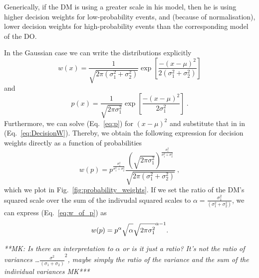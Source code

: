 \documentclass[a4paper, 12pt]{article}
\newcommand{\elabel}[1]{\label{eq:#1}}
\newcommand{\eref}[1]{(Eq.~\ref{eq:#1})}
\newcommand{\fref}[1]{Fig.~\ref{fig:#1}}
\newcommand{\be}{\begin{equation}}
\newcommand{\ee}{\end{equation}}
\newcommand{\ND}{\mathcal{N}} %
\newcommand{\MK}[1]{{\it ***MK: #1 MK***}}
\begin{document}
%
%

Generically, if the DM is using a greater scale in his model, then he is using higher decision weights for low-probability events, and (because of normalisation), lower decision weights for high-probability events than the corresponding model of the DO.


In the Gaussian case we can write the distributions explicitly
\be \elabel{DecisionW}
	w(x)=\frac{1}{\sqrt{2\pi (\sigma_1^2+\sigma_2^2)}}\exp\left[\frac{-(x -\mu )^2}{2 (\sigma_1^2+\sigma_2^2)}\right]
\ee
and
\be
	p(x)=\frac{1}{\sqrt{2\pi \sigma_1^2}}\exp\left[\frac{-(x -\mu )^2}{2 \sigma_1^2}\right] ~.
\elabel{p}
\ee
% 
Furthermore, we can solve \eref{p} for $(x -\mu)^2$ and substitute that in in \eref{DecisionW}. Thereby, we obtain the following expression for decision weights directly as a function of probabilities
\be
w(p)=p^{\frac{\sigma_1^2}{\sigma_1^2+\sigma_2^2}} \frac{\left(\sqrt{2\pi\sigma_1^2}\right)^{\frac{\sigma_1^2}{\sigma_1^2+\sigma_2^2}}}{\sqrt{2\pi(\sigma_1^2+\sigma_2^2)}} ~,
\elabel{w_of_p}
\ee
which we plot in \fref{probability_weights}. If we set the ratio of the DM's squared scale over the sum of the indivudal squared scales to $\alpha = \frac{\sigma_1^2}{\left(\sigma_1^2 + \sigma_2^2\right)}$, we can express \eref{w_of_p} as
\be
	w(p) = p^\alpha \sqrt{\alpha\strut} \sqrt{2\pi \sigma_1^2}^{\alpha-1} . 
\ee 

\MK{Is there an interpretation to $\alpha$ or is it just a ratio? It's not the ratio of variances \ldots $\frac{\sigma^2}{(\sigma_1+\sigma_2)}^2$, maybe simply the ratio of the variance and the sum of the individual variances}
\end{document}
